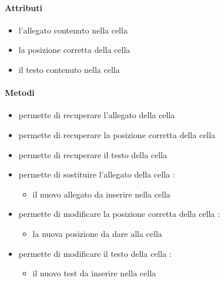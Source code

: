 \paragraph{Attributi}
\begin{itemize}
\item {}
\newline
l'allegato contenuto nella cella
\item {}
\newline
la posizione corretta della cella
\item {}
\newline
il testo contenuto nella cella
\end{itemize}
\paragraph{Metodi}
\begin{itemize}
\item {}
\newline
permette di recuperare l'allegato della cella
\newline
\item {}
\newline
permette di recuperare la posizione corretta della cella
\newline
\item {}
\newline
permette di recuperare il testo della cella
\newline
\item {}
\newline
permette di sostituire l'allegato della cella
\newline
{} :
\begin{itemize}
\item {}
\newline
il nuovo allegato da inserire nella cella
\end{itemize}
\item {}
\newline
permette di modificare la posizione corretta della cella
\newline
{} :
\begin{itemize}
\item {}
\newline
la nuova posizione da dare alla cella
\end{itemize}
\item {}
\newline
permette di modificare il testo della cella
\newline
{} :
\begin{itemize}
\item {}
\newline
il nuovo test da inserire nella cella
\end{itemize}
\end{itemize}
